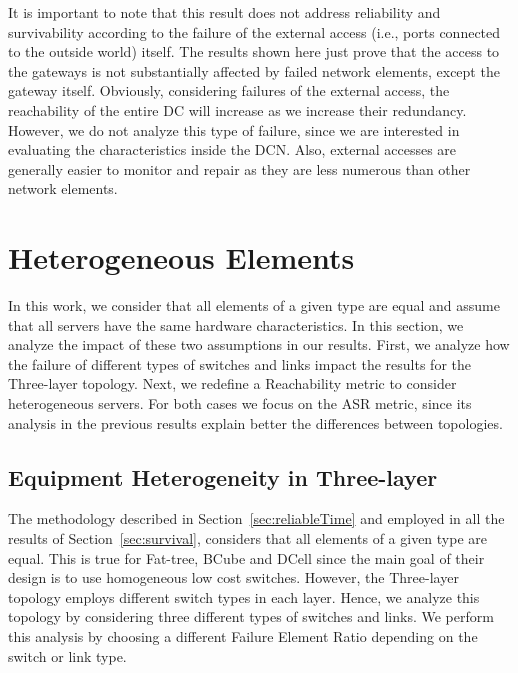 It is important to note that this result does not address reliability and survivability according to the failure of the external access (i.e., ports connected to the outside world) itself. The results shown here just prove that the access to the gateways is not substantially affected by failed network elements, except the gateway itself. Obviously, considering failures of the external access, the reachability of the entire DC will increase as we increase their redundancy. However, we do not analyze this type of failure, since we are interested in evaluating the characteristics inside the DCN. Also, external accesses are generally easier to monitor and repair as they are less numerous than other network elements.


\section{Heterogeneous Elements} 
\label{sec:het}

In this work, we consider that all elements of a given type are equal and assume that all servers have the same hardware characteristics. In this section, we analyze the impact of these two assumptions in our results. First, we analyze how the failure of different types of switches and links impact the results for the Three-layer topology. Next, we redefine a Reachability metric to consider heterogeneous servers. For both cases we focus on the ASR metric, since its analysis in the previous results explain better the differences between topologies.

\subsection{Equipment Heterogeneity in Three-layer} 
\label{sec:het3Layer}

The methodology described in Section~\ref{sec:reliableTime} and employed in all the results of Section~\ref{sec:survival}, considers that all elements of a given type are equal. 
This is true for Fat-tree, BCube and DCell since the main goal of their design is to use homogeneous low cost switches. However, the Three-layer topology employs different switch types in each layer. Hence, we analyze this topology by considering three different types of switches and links. We perform this analysis by choosing a different Failure Element Ratio depending on the switch or link type.

